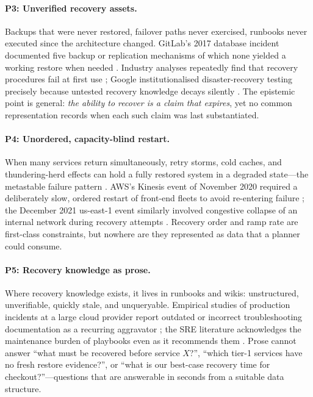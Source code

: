 \paragraph{P3: Unverified recovery assets.}
Backups that were never restored, failover paths never exercised, runbooks never executed since the architecture changed. GitLab's 2017 database incident documented five backup or replication mechanisms of which none yielded a working restore when needed \citep{gitlab2017postmortem}. Industry analyses repeatedly find that recovery procedures fail at first use \citep{uptime2024outage,adkins2020secure}; Google institutionalised disaster-recovery testing precisely because untested recovery knowledge decays silently \citep{krishnan2012weathering}. The epistemic point is general: \emph{the ability to recover is a claim that expires}, yet no common representation records when each such claim was last substantiated.

\paragraph{P4: Unordered, capacity-blind restart.}
When many services return simultaneously, retry storms, cold caches, and thundering-herd effects can hold a fully restored system in a degraded state---the metastable failure pattern \citep{bronson2021metastable,huang2022metastable}. AWS's Kinesis event of November 2020 required a deliberately slow, ordered restart of front-end fleets to avoid re-entering failure \citep{aws2020kinesis}; the December 2021 us-east-1 event similarly involved congestive collapse of an internal network during recovery attempts \citep{aws2021useast}. Recovery order and ramp rate are first-class constraints, but nowhere are they represented as data that a planner could consume.

\paragraph{P5: Recovery knowledge as prose.}
Where recovery knowledge exists, it lives in runbooks and wikis: unstructured, unverifiable, quickly stale, and unqueryable. Empirical studies of production incidents at a large cloud provider report outdated or incorrect troubleshooting documentation as a recurring aggravator \citep{ghosh2022fight,chen2020incident}; the SRE literature acknowledges the maintenance burden of playbooks even as it recommends them \citep{beyer2016sre}. Prose cannot answer ``what must be recovered before service $X$?'', ``which tier-1 services have no fresh restore evidence?'', or ``what is our best-case recovery time for checkout?''---questions that are answerable in seconds from a suitable data structure.

